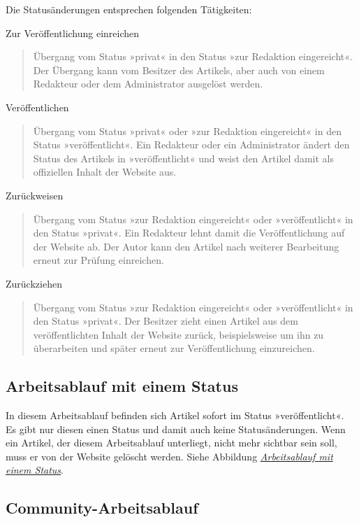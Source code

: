 \documentclass[a4paper,12pt,ngerman]{manual}
\begin{document}
Die Statusänderungen entsprechen folgenden Tätigkeiten:

Zur Veröffentlichung einreichen
\begin{quote}

Übergang vom Status
»privat« in den Status »zur Redaktion eingereicht«. Der Übergang kann vom
Besitzer des Artikels, aber auch von einem Redakteur oder dem Administrator
ausgelöst werden.
\end{quote}

Veröffentlichen
\begin{quote}

Übergang vom Status »privat« oder »zur Redaktion
eingereicht« in den Status »veröffentlicht«. Ein Redakteur oder ein
Administrator ändert den Status des Artikels in »veröffentlicht« und weist
den Artikel damit als offiziellen Inhalt der Website aus.
\end{quote}

Zurückweisen
\begin{quote}

Übergang vom Status »zur Redaktion eingereicht« oder
»veröffentlicht« in den Status »privat«. Ein Redakteur lehnt damit die
Veröffentlichung auf der Website ab. Der Autor kann den Artikel nach
weiterer Bearbeitung erneut zur Prüfung einreichen.
\end{quote}

Zurückziehen
\begin{quote}

Übergang vom Status »zur Redaktion eingereicht« oder
»veröffentlicht« in den Status »privat«. Der Besitzer zieht einen
Artikel aus dem veröffentlichten Inhalt der Website zurück,
beispielsweise um ihn zu überarbeiten und später erneut zur
Veröffentlichung einzureichen.
\end{quote}


\subsection{Arbeitsablauf mit einem Status}

In diesem Arbeitsablauf befinden sich Artikel sofort im Status
»veröffentlicht«. Es gibt nur diesen einen Status und damit auch keine
Statusänderungen. Wenn ein Artikel, der diesem Arbeitsablauf unterliegt, nicht
mehr sichtbar sein soll, muss er von der Website gelöscht werden. Siehe
Abbildung \hyperlink{fig-workflow-ein-status}{\emph{Arbeitsablauf mit einem Status}}.
\hypertarget{sec-comm-arbe}{}

\subsection{Community-Arbeitsablauf}
\end{document}
